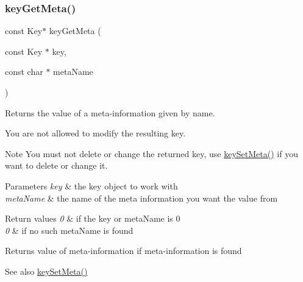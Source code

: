 \subsubsection{\texorpdfstring{keyGetMeta()}{keyGetMeta()}}
{\footnotesize\ttfamily const Key$\ast$ key\+Get\+Meta (\begin{DoxyParamCaption}\item[{const Key $\ast$}]{key,  }\item[{const char $\ast$}]{meta\+Name }\end{DoxyParamCaption})}



Returns the value of a meta-\/information given by name. 

You are not allowed to modify the resulting key.


\begin{DoxyCode}{0}
\DoxyCodeLine{\{}
\DoxyCodeLine{        \{}
\DoxyCodeLine{                \textcolor{comment}{// the type of the key is boolean}}
\DoxyCodeLine{        \}}
\DoxyCodeLine{\}}
\end{DoxyCode}


\begin{DoxyNote}{Note}
You must not delete or change the returned key, use \mbox{\hyperlink{group__keymeta_gae1f15546b234ffb6007d8a31178652b9}{key\+Set\+Meta()}} if you want to delete or change it.
\end{DoxyNote}

\begin{DoxyParams}{Parameters}
{\em key} & the key object to work with \\
\hline
{\em meta\+Name} & the name of the meta information you want the value from \\
\hline
\end{DoxyParams}

\begin{DoxyRetVals}{Return values}
{\em 0} & if the key or meta\+Name is 0 \\
\hline
{\em 0} & if no such meta\+Name is found \\
\hline
\end{DoxyRetVals}
\begin{DoxyReturn}{Returns}
value of meta-\/information if meta-\/information is found 
\end{DoxyReturn}
\begin{DoxySeeAlso}{See also}
\mbox{\hyperlink{group__keymeta_gae1f15546b234ffb6007d8a31178652b9}{key\+Set\+Meta()}} 
\end{DoxySeeAlso}
\mbox{\label{group__keymeta_ga11706f1753e67933f7cffc5c0345cd29}} 
